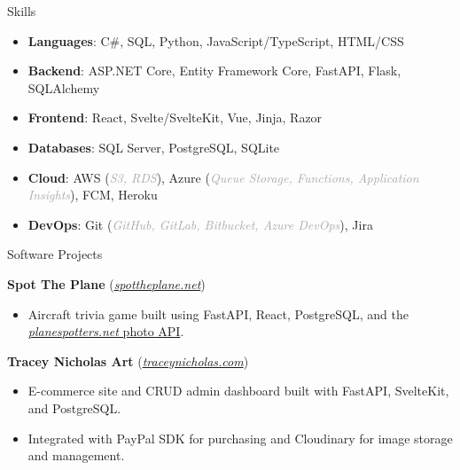 \documentclass[calibri]{mcdowellcv}
\begin{document}
	\begin{cvsection}{Skills}
		\begin{cvsubsection}{}{}{}	
			\begin{itemize}
				\item \textbf{Languages}: C\#, SQL, Python, JavaScript/TypeScript, HTML/CSS
				\item \textbf{Backend}: ASP.NET Core, Entity Framework Core, FastAPI, Flask, SQLAlchemy
				\item \textbf{Frontend}: React, Svelte/SvelteKit, Vue, Jinja, Razor
				\item \textbf{Databases}: SQL Server, PostgreSQL, SQLite
				\item \textbf{Cloud}: AWS (\textit{\textcolor{darkgray}{S3, RDS}}), Azure (\textit{\textcolor{darkgray}{Queue Storage, Functions, Application Insights}}), FCM, Heroku
				\item \textbf{DevOps}: Git (\textit{\textcolor{darkgray}{GitHub, GitLab, Bitbucket, Azure DevOps}}), Jira 
			\end{itemize}
		\end{cvsubsection}
	\end{cvsection}

	\begin{cvsection}{Software Projects}
		\begin{cvsubsection}{}{}{}
			\textbf{Spot The Plane} (\textit{{\color{blue}\href{https://www.spottheplane.net/}{spottheplane.net}}})
			\begin{itemize}
				\item Aircraft trivia game built using FastAPI, React, PostgreSQL, and the \color{blue}\href{https://www.planespotters.net/photo/api}{\textit{planespotters.net} photo API}.
			\end{itemize}
		\end{cvsubsection}

		\begin{cvsubsection}{}{}{}
			\textbf{Tracey Nicholas Art} (\textit{{\color{blue}\href{https://ceynic-staging-3fadbec13739.herokuapp.com/}{traceynicholas.com}}})
			\begin{itemize}
				\item E-commerce site and CRUD admin dashboard built with FastAPI, SvelteKit, and PostgreSQL.
				\item Integrated with PayPal SDK for purchasing and Cloudinary for image storage and management.
			\end{itemize}
		\end{cvsubsection}
	\end{cvsection}
	
\end{document}
